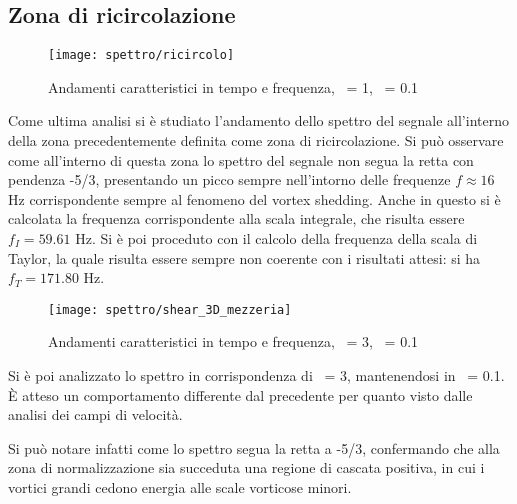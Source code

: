 \documentclass{article} %
\newcommand{\xd}{\nicefrac{\textrm{x}}{\textrm{D}}\ }
\newcommand{\yd}{\nicefrac{\textrm{y}}{\textrm{D}}\ }
\begin{document}
\subsection{Zona di ricircolazione}
\begin{figure}[h!]
	\texttt{[image: spettro/ricircolo]}
	\caption{Andamenti caratteristici in tempo e frequenza, \xd = 1, \yd = 0.1}
\end{figure}
Come ultima analisi si è studiato l'andamento dello spettro del segnale all'interno della zona precedentemente definita come zona di ricircolazione.
Si può osservare come all'interno di questa zona lo spettro del segnale non segua la retta con pendenza -5/3, presentando un picco sempre nell'intorno delle frequenze $f\approx16$ Hz corrispondente sempre al fenomeno del vortex shedding.
Anche in questo si è calcolata la frequenza corrispondente alla scala integrale, che risulta essere $f_I=59.61$ Hz.
Si è poi proceduto  con il calcolo della frequenza della scala di Taylor, la quale risulta essere sempre non coerente con i risultati attesi: si ha $f_T=171.80$ Hz.\par
\begin{figure}[h!]
	\texttt{[image: spettro/shear\_3D\_mezzeria]}
	\caption{Andamenti caratteristici in tempo e frequenza, \xd = 3, \yd = 0.1}
\end{figure}
Si è poi analizzato lo spettro in corrispondenza di \xd = 3, mantenendosi in \yd = 0.1. È atteso un comportamento differente dal precedente per quanto visto dalle analisi dei campi di velocità.\par
Si può notare infatti come lo spettro segua la retta a -5/3, confermando che alla zona di normalizzazione	 sia succeduta una regione di cascata positiva, in cui i vortici grandi cedono energia alle scale vorticose minori. 
\newpage
\end{document}
